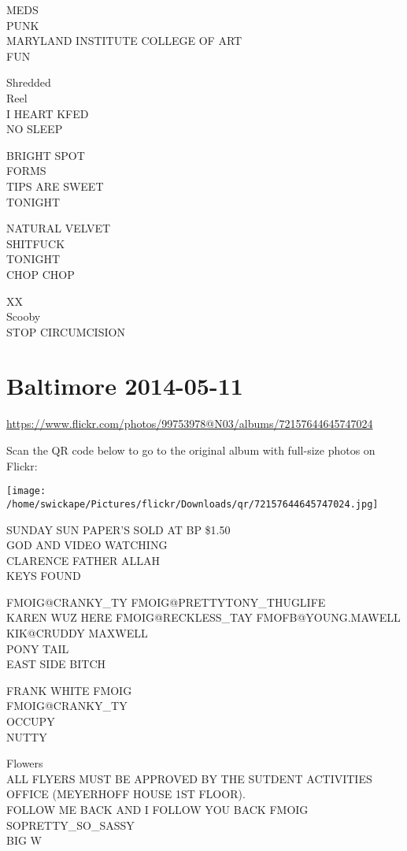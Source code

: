 \documentclass[10pt,letterpaper]{article}
\begin{document}
MEDS\\
PUNK\\
MARYLAND INSTITUTE COLLEGE OF ART\\
FUN

Shredded\\
Reel\\
I HEART KFED\\
NO SLEEP

BRIGHT SPOT\\
FORMS\\
TIPS ARE SWEET\\
TONIGHT

NATURAL VELVET\\
SHITFUCK\\
TONIGHT\\
CHOP CHOP

XX\\
Scooby\\
STOP CIRCUMCISION


\section*{Baltimore 2014-05-11}

\url{https://www.flickr.com/photos/99753978@N03/albums/72157644645747024}

Scan the QR code below to go to the original album with full-size photos on Flickr:

\texttt{[image: /home/swickape/Pictures/flickr/Downloads/qr/72157644645747024.jpg]}


SUNDAY SUN PAPER'S SOLD AT BP \$1.50\\
GOD AND VIDEO WATCHING\\
CLARENCE FATHER ALLAH\\
KEYS FOUND

FMOIG@CRANKY\_TY FMOIG@PRETTYTONY\_THUGLIFE\\
KAREN WUZ HERE FMOIG@RECKLESS\_TAY FMOFB@YOUNG.MAWELL KIK@CRUDDY MAXWELL\\
PONY TAIL\\
EAST SIDE BITCH

FRANK WHITE FMOIG\\
FMOIG@CRANKY\_TY\\
OCCUPY\\
NUTTY

Flowers\\
ALL FLYERS MUST BE APPROVED BY THE SUTDENT ACTIVITIES OFFICE (MEYERHOFF HOUSE 1ST FLOOR).\\
FOLLOW ME BACK AND I FOLLOW YOU BACK FMOIG SOPRETTY\_SO\_SASSY\\
BIG W
\end{document}
